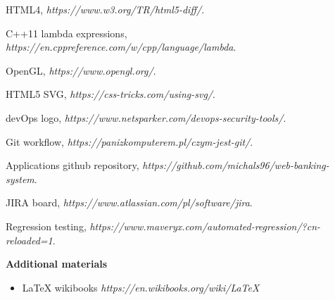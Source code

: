 \documentclass[a4paper,12pt]{book}
\begin{document}
{\begin{thebibliography}{9}
  HTML4,
  \emph{https://www.w3.org/TR/html5-diff/}.
  
  C++11 lambda expressions,
  \emph{https://en.cppreference.com/w/cpp/language/lambda}.
  
  OpenGL,
  \emph{https://www.opengl.org/}.
  
  HTML5 SVG,
  \emph{https://css-tricks.com/using-svg/}.

  devOps logo,
  \emph{https://www.netsparker.com/devops-security-tools/}.
  
  Git workflow,
  \emph{https://panizkomputerem.pl/czym-jest-git/}.
  
  Applications github repository,
  \emph{https://github.com/michals96/web-banking-system}.   

  JIRA board,
  \emph{https://www.atlassian.com/pl/software/jira}.   
  
  Regression testing,
  \emph{https://www.maveryx.com/automated-regression/?cn-reloaded=1}. 
\end{thebibliography}

\textbf{Additional materials} \begin{itemize}
	\item LaTeX wikibooks \newline \textit{https://en.wikibooks.org/wiki/LaTeX}

\end{itemize}
}
\newpage

\linespread{1.3}
\selectfont
\end{document}

